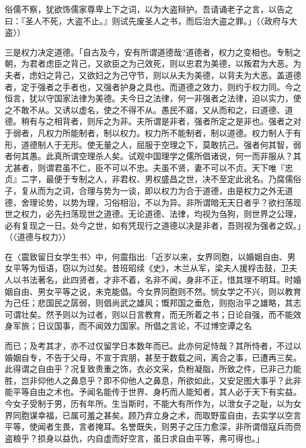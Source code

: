 \noindent 俗儒不察，犹欲饰儒家尊卑上下之词，以为大盗辩护。吾请诵老子之言，以告之曰：『圣人不死，大盗不止。』则试先废圣人之书，而后治大盗之罪。」（〈政府与大盗〉）

三是权力决定道德。「自古及今，安有所谓道德哉?道德者，权力之变相也。专制之朝，为君者虑臣之背己，又欲臣之为己效死，则以忠君为美德，以叛君为大恶。为夫者，虑妇之背己，又欲妇之为己守节，则以从夫为美德，以背夫为大恶。盖道德者，定于强者之手者也，又强者护身之具也。而道德之效力，则约于权力同。今之恒言，犹以守国家法律为美德。夫今日之法律，何一非强者之法律，迫以实力，使之不敢不从。又诱以虚名，使之不得不从。愚民不寤，又从而和之，曰道德、道德。稍有与之相背者，则斥之为非。夫所谓是非者，强者所定之是非也。强者之对于弱者，凡权力所能制者，制以权力。权力所不能制者，制以道德。权力制人于有形，道德制人于无形。使无量之人，屈服于空理之下，莫敢抗己。强者何其智，弱者何其愚。此真所谓空理杀人矣。试观中国理学之儒所倡诸说，何一而非服从？其尤甚者，则谓君虽不仁，臣不可以不忠。夫虽不贤，妻不可以不贞。天下唯『忠贞』二字，最便于专制之人，非君权、男权盛昌之世，决不至定此讹名。乃腐儒俗子，复从而为之词，合理与势为一谈，即以权力为合于道德，由是权力之外无道德，舍理论势，以势为理，习俗相沿，不以为异。非所谓暗无天日者乎？欲扫荡现世之权力，必先扫荡现世之道德。无论道德、法律，均视为刍狗，则世界之公理，必有复现之一日。处今之世，如有凭现行之道德以决是非者，吾则视为强者之奴。」（〈道德与权力〉）

在〈震致留日女学生书〉中，何震指出:「近岁以来，女界同胞，以婚姻自由、男女平等为恒语，窃以为过矣。昔班昭续《史》，木兰从军，梁夫人援桴击鼓，卫夫人以书法著名，此四贤者，才非不着，名非不闻，身非不正，惜其理不明耳。时婚姻自由、男女平等之说，未克能倡。今女界同胞则不然。悯女学之不兴，则以教育为己任；悲国民之孱弱，则倡尚武之雄风；慨邦国之垂危，则抱治平之雄略，其志可谓壮矣。然予则以为过者，则以日言教育，而无所着之书；日论自强，而不能效身军旅；日议国事，而不闻效力国家。所倡之言论，不过博空谭之名


\noindent 而已；及考其才，亦不过仅留学日本数年而已。此亦何足恃哉？其所恃者，不过以婚姻自专，不告于父母，不宣于宾朋，甚至于数载之间，离合之事，已遭再三矣。此得谓之自由乎？况复致贵重之饰，衣必文采，负粉凝脂，所致之件，已非己力能胜，岂非仰他人之鼻息乎？即不仰他人之鼻息，所欲如此，又安足图大事乎？此非能平等自由之术也。予闻名能传于世界、身朽而人能知者，其人必于天下有实益。今女子受制于男，历有年所。生当斯时，不能大有所作为，以泄女子之耻，以为女界同胞谋幸福，已属可羞之甚矣。顾乃弃立身之术，而取野蛮自由，去实学以空言平等，使闻者生畏，言者掩耳。名誉既失，则男子之压力愈深，非所谓借寇兵而赍盗粮乎？损身以益仇，内自虚而好空言，虽日求自由平等，弗可得也。」

